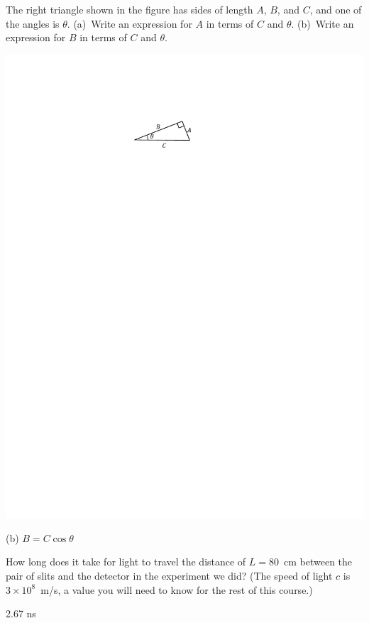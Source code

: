 \begin{minipage}{0.74 \textwidth}
\begin{Exercise}[difficulty=1]
The right triangle shown in the figure has sides of length $A$, $B$, and $C$, and one of the angles is $\theta$.  (a)~Write an expression for $A$ in terms of $C$ and $\theta$.  (b)~Write an expression for $B$ in terms of $C$ and $\theta$.  
\answerspace{0.2in}
\end{Exercise}
\end{minipage}
\begin{minipage}{0.25 \textwidth}
\hspace{\fill}\includegraphics{M_problems/waves_velocity/triangle.pdf}
\end{minipage}
\begin{Answer}
(b) $B=C \cos\theta$
\end{Answer}

\begin{Exercise}[difficulty=1]
How long does it take for light to travel the distance of $L=80$~cm between the pair of slits and the detector in the experiment we did?  (The speed of light $c$ is $3 \times 10^8$~m/s, a value you will need to know for the rest of this course.)
\end{Exercise}
\begin{Answer}
2.67 ns
\end{Answer}

